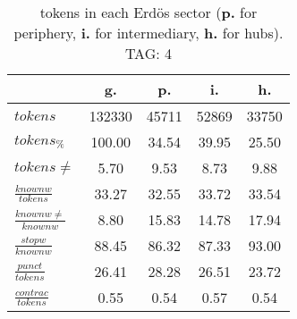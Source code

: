\begin{table}[h!]
\begin{center}
\begin{tabular}{| l || c | c | c | c |}\hline
 & {\bf g.} & {\bf p.} & {\bf i.} & {\bf h.} \\\hline\hline
$tokens$ & 132330  & 45711  & 52869  & 33750 \\
$tokens_{\%}$ & 100.00  & 34.54  & 39.95  & 25.50 \\
$tokens \neq$ & 5.70  & 9.53  & 8.73  & 9.88 \\\hline
$\frac{knownw}{tokens}$ & 33.27  & 32.55  & 33.72  & 33.54 \\
$\frac{knownw \neq}{knownw}$ & 8.80  & 15.83  & 14.78  & 17.94 \\\hline
$\frac{stopw}{knownw}$ & 88.45  & 86.32  & 87.33  & 93.00 \\
$\frac{punct}{tokens}$ & 26.41  & 28.28  & 26.51  & 23.72 \\
$\frac{contrac}{tokens}$ & 0.55  & 0.54  & 0.57  & 0.54 \\\hline
\end{tabular}
\caption{tokens in each Erd\"os sector ({{\bf p.}} for periphery, {{\bf i.}} for intermediary, 
    {{\bf h.}} for hubs). TAG: 4}
\end{center}
\end{table}